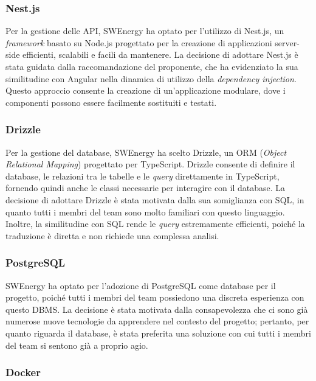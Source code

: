 \subsubsection{Nest.js}

Per la gestione delle API, SWEnergy ha optato per l'utilizzo di Nest.js, un
\textit{framework} basato su Node.js progettato per la creazione di applicazioni
server-side efficienti, scalabili e facili da mantenere. La decisione di
adottare Nest.js è stata guidata dalla raccomandazione del proponente, che ha
evidenziato la sua similitudine con Angular nella dinamica di utilizzo della
\textit{dependency injection}. Questo approccio consente la creazione di
un'applicazione modulare, dove i componenti possono essere facilmente sostituiti
e testati.

\subsubsection{Drizzle}

Per la gestione del database, SWEnergy ha scelto Drizzle, un ORM (\textit{Object
	Relational Mapping}) progettato per TypeScript. Drizzle consente di definire
il database, le relazioni tra le tabelle e le \textit{query} direttamente in
TypeScript, fornendo quindi anche le classi necessarie per interagire con il
database. La decisione di adottare Drizzle è stata motivata dalla sua
somiglianza con SQL, in quanto tutti i membri del team sono molto familiari
con questo linguaggio. Inoltre, la similitudine con SQL rende le
\textit{query} estremamente efficienti, poiché la traduzione è diretta e non
richiede una complessa analisi.

\subsubsection{PostgreSQL}

SWEnergy ha optato per l'adozione di PostgreSQL come database per il progetto,
poiché tutti i membri del team possiedono una discreta esperienza con questo
DBMS. La decisione è stata motivata dalla consapevolezza che ci sono già
numerose nuove tecnologie da apprendere nel contesto del progetto; pertanto, per
quanto riguarda il database, è stata preferita una soluzione con cui tutti i
membri del team si sentono già a proprio agio.

\subsubsection{Docker}

